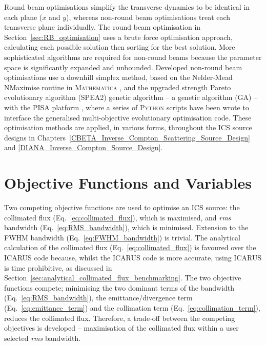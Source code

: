 \documentclass[../main.tex]{subfiles}
\begin{document}
Round beam optimisations simplify the transverse dynamics to be identical in each plane ($x$ and $y$), whereas non-round beam optimisations treat each transverse plane individually. The round beam optimisation in Section~\ref{sec:RB_optimisation} uses a brute force optimisation approach, calculating each possible solution then sorting for the best solution. More sophisticated algorithms are required for non-round beams because the parameter space is significantly expanded and unbounded. Developed non-round beam optimisations use a downhill simplex method, based on the Nelder-Mead NMaximise routine in \textsc{Mathematica} \cite{wolfram2021nmaximize}, and the upgraded strength Pareto evolutionary algorithm (\textsc{SPEA2}) genetic algorithm \cite{zitzler2001spea2} -- a genetic algorithm (GA) -- with the \textsc{PISA} platform \cite{bleuler2003pisa}, where a series of \textsc{Python} scripts have been wrote to interface the generalised multi-objective evolutionary optimisation code. These optimisation methods are applied, in various forms, throughout the ICS source designs in Chapters~\ref{CBETA_Inverse_Compton_Scattering_Source_Design} and \ref{DIANA_Inverse_Compton_Source_Design}.    

\section{Objective Functions and Variables}
\label{sec:objective_functions_and_variables}

Two competing objective functions are used to optimise an ICS source: the collimated flux (Eq.~\ref{eq:collimated_flux}), which is maximised, and \textit{rms} bandwidth (Eq.~\ref{eq:RMS_bandwidth}), which is minimised. Extension to the FWHM bandwidth (Eq.~\ref{eq:FWHM_bandwidth}) is trivial. The analytical calculation of the collimated flux (Eq.~\ref{eq:collimated_flux}) is favoured over the \textsc{ICARUS} code because, whilst the \textsc{ICARUS} code is more accurate, using \textsc{ICARUS} is time prohibitive, as discussed in Section~\ref{sec:analytical_collimated_flux_benchmarking}. The two objective functions compete; minimising the two dominant terms of the  bandwidth (Eq.~\ref{eq:RMS_bandwidth}), the emittance/divergence term (Eq.~\ref{eq:emittance_term}) and the collimation term (Eq.~\ref{eq:collimation_term}), reduces the collimated flux. Therefore, a trade-off between the competing objectives is developed -- maximisation of the collimated flux within a user selected \textit{rms} bandwidth. 
\end{document}
